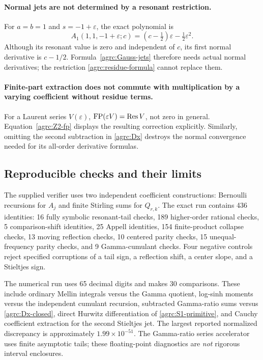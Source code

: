 \paragraph{Normal jets are not determined by a resonant restriction.}
For $a=b=1$ and $s=-1+\varepsilon$, the exact polynomial is
\begin{equation}\label{agrc:normal-counterexample}
 A_1(1,1,-1+\varepsilon;c)
          =(c-\tfrac12)\varepsilon-\tfrac12\varepsilon^2.
\end{equation}
Although its resonant value is zero and independent of $c$, its first
normal derivative is $c-1/2$. Formula~\eqref{agrc:Gauss-jets} therefore
needs actual normal derivatives; the restriction
\eqref{agrc:residue-formula} cannot replace them.

\paragraph{Finite-part extraction does not commute with multiplication
by a varying coefficient without residue terms.}
For a Laurent series $V(\varepsilon)$,
$\operatorname{FP}(\varepsilon V)=\operatorname{Res} V$, not zero in general.
Equation~\eqref{agrc:Z2-fp} displays the resulting correction explicitly.
Similarly, omitting the second subtraction in \eqref{agrc:Dx} destroys
the normal convergence needed for its all-order derivative formulas.

\subsection{Reproducible checks and their limits}

The supplied verifier uses two independent coefficient constructions:
Bernoulli recursions for $A_j$ and finite Stirling sums for $Q_{r,k}$.
The exact run contains 436 identities: 16 fully symbolic resonant-tail
checks, 189 higher-order rational checks, 5 comparison-shift identities,
25 Appell identities, 154 finite-product collapse checks, 13 moving
reflection checks, 10 centered parity checks, 15 unequal-frequency
parity checks, and 9 Gamma-cumulant checks. Four negative controls reject
specified corruptions of a tail sign, a reflection shift, a center slope,
and a Stieltjes sign.

The numerical run uses 65 decimal digits and makes 30 comparisons.
These include ordinary Mellin integrals versus the Gamma quotient,
log-sinh moments versus the independent cumulant recursion,
subtracted Gamma-ratio sums versus \eqref{agrc:Dx-closed}, direct
Hurwitz differentiation of \eqref{agrc:S1-primitive}, and Cauchy
coefficient extraction for the second Stieltjes jet. The largest
reported normalized discrepancy is approximately $1.99\times10^{-51}$.
The Gamma-ratio series accelerator uses finite asymptotic tails; these
floating-point diagnostics are \emph{not} rigorous interval enclosures.

